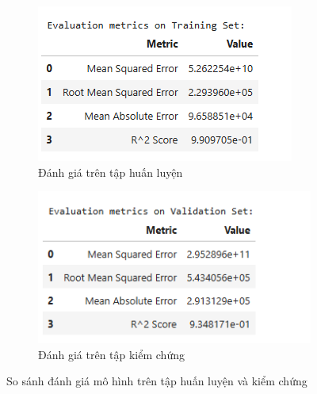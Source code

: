 \begin{figure}[H]
    \centering
    \begin{subfigure}[b]{0.445\textwidth}
        \centering
        \includegraphics[width=\linewidth]{img/metrictrainPCA.png}
        \caption{Đánh giá trên tập huấn luyện}
        \label{fig:PCA-linear-train}
    \end{subfigure}
    \hfill
    \begin{subfigure}[b]{0.48\textwidth}
        \centering
        \includegraphics[width=\linewidth]{img/metricvalPCA.png}
        \caption{Đánh giá trên tập kiểm chứng}
        \label{fig:PCAlinear-valid}
    \end{subfigure}
    \caption{So sánh đánh giá mô hình trên tập huấn luyện và kiểm chứng} 
    \label{fig:PCA-linear-eval}
\end{figure}
